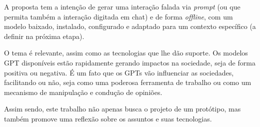 \documentclass[10pt, conference, compsocconf]{IEEEtran}
\begin{document}
A proposta tem a intenção de gerar uma interação falada via \textit{prompt} (ou que permita também a interação digitada em chat) e de forma \textit{offline}, com um modelo baixado, instalado, configurado e adaptado para um contexto específico (a definir na próxima etapa).

O tema é relevante, assim como as tecnologias que lhe dão suporte. Os modelos GPT disponíveis estão rapidamente gerando impactos na sociedade, seja de forma positiva ou negativa. É um fato que os GPTs vão influenciar as sociedades, facilitando ou não, seja como uma poderosa ferramenta de trabalho ou como um mecanismo de manipulação e condução de opiniões.

Assim sendo, este trabalho não apenas busca o projeto de um protótipo, mas também promove uma reflexão sobre os assuntos e suas tecnologias.


\printbibliography
\end{document}
